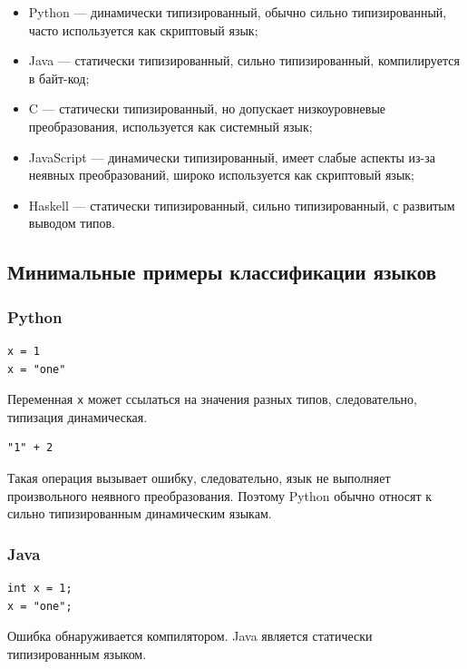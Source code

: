 \documentclass[12pt,a4paper]{article}
\begin{document}
\begin{itemize}
    \item Python --- динамически типизированный, обычно сильно типизированный,
    часто используется как скриптовый язык;
    \item Java --- статически типизированный, сильно типизированный, компилируется
    в байт-код;
    \item C --- статически типизированный, но допускает низкоуровневые преобразования,
    используется как системный язык;
    \item JavaScript --- динамически типизированный, имеет слабые аспекты из-за
    неявных преобразований, широко используется как скриптовый язык;
    \item Haskell --- статически типизированный, сильно типизированный, с развитым
    выводом типов.
\end{itemize}

\subsection{Минимальные примеры классификации языков}

\subsubsection{Python}

\begin{verbatim}
x = 1
x = "one"
\end{verbatim}

Переменная \texttt{x} может ссылаться на значения разных типов, следовательно,
типизация динамическая.

\begin{verbatim}
"1" + 2
\end{verbatim}

Такая операция вызывает ошибку, следовательно, язык не выполняет произвольного
неявного преобразования. Поэтому Python обычно относят к сильно типизированным
динамическим языкам.

\subsubsection{Java}

\begin{verbatim}
int x = 1;
x = "one";
\end{verbatim}

Ошибка обнаруживается компилятором. Java является статически типизированным языком.
\end{document}
